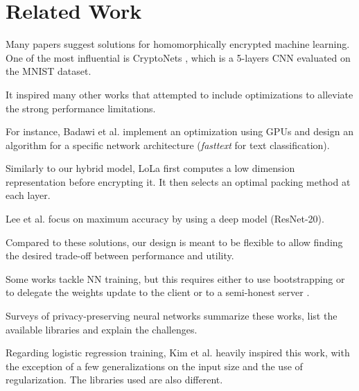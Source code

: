 \documentclass[a4paper,11pt,oneside]{report}
\begin{document}
\chapter{Related Work}



Many papers suggest solutions for homomorphically encrypted machine learning.
One of the most influential is CryptoNets \cite{dowlin_cryptonets_2016}, which is a 5-layers CNN evaluated on the MNIST dataset.

It inspired many other works that attempted to include optimizations to alleviate the strong performance limitations.

For instance, Badawi et al. \cite{badawi_privft_2019, badawi_towards_2020} implement an optimization using GPUs and design an algorithm for a specific network architecture (\emph{fasttext} for text classification).

Similarly to our hybrid model, LoLa \cite{brutzkus_low_2019} first computes a low dimension representation before encrypting it. It then selects an optimal packing method at each layer.

Lee et al. \cite{lee_privacy-preserving_2021} focus on maximum accuracy by using a deep model (ResNet-20).

Compared to these solutions, our design is meant to be flexible to allow finding the desired trade-off between performance and utility.

Some works tackle NN training, but this requires either to use bootstrapping or to delegate the weights update to the client \cite{mihara_neural_2020} or to a semi-honest server \cite{bellafqira_secure_2018}.

Surveys \cite{pulido-gaytan_privacy-preserving_2021,podschwadt_sok_2022} of privacy-preserving neural networks summarize these works, list the available libraries and explain the challenges.

Regarding logistic regression training, Kim et al. \cite{kim_logistic_2018} heavily inspired this work, with the exception of a few generalizations on the input size and the use of regularization.
The libraries used are also different.
\end{document}
